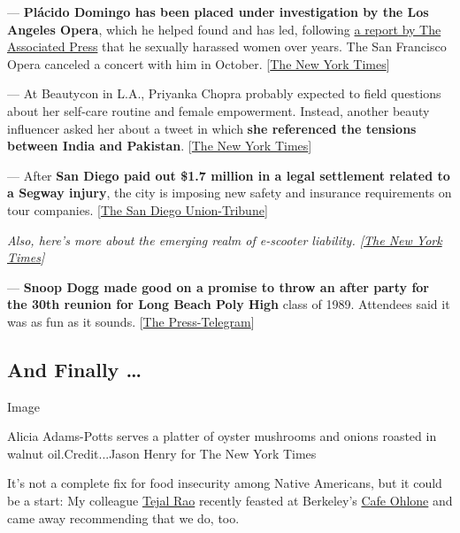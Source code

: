 --- \textbf{Plácido Domingo has been placed under investigation by the
Los Angeles Opera}, which he helped found and has led, following
\href{https://www.apnews.com/c2d51d690d004992b8cfba3bad827ae9}{a report
by The Associated Press} that he sexually harassed women over years. The
San Francisco Opera canceled a concert with him in October.
{[}\href{https://www.nytimes3xbfgragh.onion/2019/08/13/arts/music/placido-domingo-sexual-harassment-opera.html}{The
New York Times}{]}

--- At Beautycon in L.A., Priyanka Chopra probably expected to field
questions about her self-care routine and female empowerment. Instead,
another beauty influencer asked her about a tweet in which \textbf{she
referenced the tensions between India and Pakistan}.
{[}\href{https://www.nytimes3xbfgragh.onion/2019/08/13/style/priyanka-chopra-beautycon-india-pakistan.html}{The
New York Times}{]}

--- After \textbf{San Diego paid out \$1.7 million in a legal settlement
related to a Segway injury}, the city is imposing new safety and
insurance requirements on tour companies.
{[}\href{https://www.sandiegouniontribune.com/communities/san-diego/story/2019-08-12/san-diego-cracking-down-on-segways-to-curb-injury-payouts}{The
San Diego Union-Tribune}{]}

\emph{Also, here's more about the emerging realm of e-scooter liability.
{[}}\href{https://www.nytimes3xbfgragh.onion/2019/02/06/us/california-today-scooter-lawsuits-liability.html}{\emph{The
New York Times}}\emph{{]}}

--- \textbf{Snoop Dogg made good on a promise to throw an after party
for the 30th reunion for Long Beach Poly High} class of 1989. Attendees
said it was as fun as it sounds.
{[}\href{https://www.presstelegram.com/2019/08/09/snoop-dogg-gives-fellow-long-beach-poly-high-class-of-89-alums-the-party-of-a-lifetime-for-30-year-reunion/}{The
Press-Telegram}{]}

\hypertarget{and-finally-}{%
\subsection{And Finally \ldots{}}\label{and-finally-}}

Image

Alicia Adams-Potts serves a platter of oyster mushrooms and onions
roasted in walnut oil.Credit...Jason Henry for The New York Times

It's not a complete fix for food insecurity among Native Americans, but
it could be a start: My colleague
\href{https://www.nytimes3xbfgragh.onion/by/tejal-rao}{Tejal Rao}
recently feasted at Berkeley's \href{https://www.makamham.com/}{Cafe
Ohlone} and came away recommending that we do, too.

